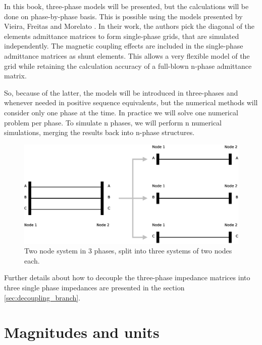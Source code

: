 \documentclass[a4paper,twoside,fleqn]{tufte-book}
\begin{document}
In this book, three-phase models will be presented, but the calculations will be done on phase-by-phase basis. This is possible using the models presented by Vieira, Freitas and Morelato \cite{vieira2004phase}. In their work, the authors pick the diagonal of the elements admittance matrices to form single-phase grids, that are simulated independently. The magnetic coupling effects are included in the single-phase admittance matrices as shunt elements. This allows a very flexible model of the grid while retaining the calculation accuracy of a full-blown n-phase admittance matrix.

So, because of the latter, the models will be introduced in three-phases and whenever needed in positive sequence equivalents, but the numerical methods will consider only one phase at the time. In practice we will solve one numerical problem per phase. To simulate n phases, we will perform n numerical simulations, merging the results back into n-phase structures.

\begin{figure}
  \includegraphics[width=\linewidth]{img/3p_to_1p.eps}
  \caption{Two node system in 3 phases, split into three systems of two nodes each.}
  \label{fig:3p_to_1p}
\end{figure}

Further details about how to decouple the three-phase impedance matrices into three single phase impedances are presented in the section \ref{sec:decoupling_branch}.

\chapter{Magnitudes and units}
\end{document}
